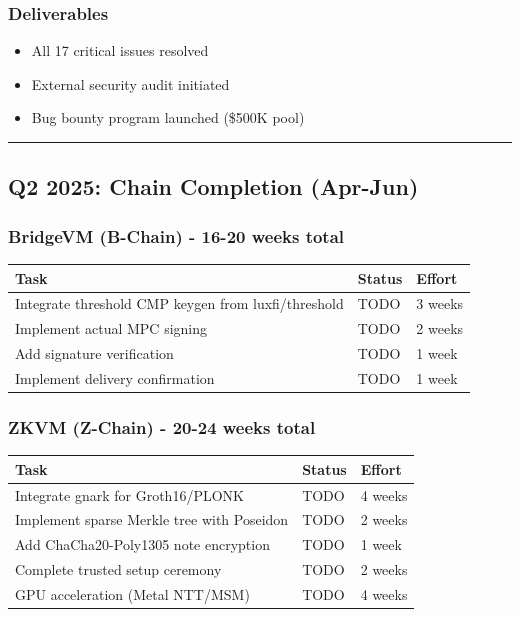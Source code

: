 \documentclass[
]{article}
\newcounter{none} %
\providecommand{\tightlist}{%
  \setlength{\itemsep}{0pt}\setlength{\parskip}{0pt}}
\begin{document}
\subsubsection{Deliverables}\label{deliverables}

\begin{itemize}
\tightlist
\item[$\square$]
  All 17 critical issues resolved
\item[$\square$]
  External security audit initiated
\item[$\square$]
  Bug bounty program launched (\$500K pool)
\end{itemize}

\begin{center}\rule{0.5\linewidth}{0.5pt}\end{center}

\subsection{Q2 2025: Chain Completion
(Apr-Jun)}\label{q2-2025-chain-completion-apr-jun}

\subsubsection{BridgeVM (B-Chain) - 16-20 weeks
total}\label{bridgevm-b-chain---16-20-weeks-total}

{\def\LTcaptype{none} %
\begin{longtable}[]{@{}lll@{}}
\toprule\noalign{}
Task & Status & Effort \\
\midrule\noalign{}
\endhead
\bottomrule\noalign{}
\endlastfoot
Integrate threshold CMP keygen from luxfi/threshold & TODO & 3 weeks \\
Implement actual MPC signing & TODO & 2 weeks \\
Add signature verification & TODO & 1 week \\
Implement delivery confirmation & TODO & 1 week \\
\end{longtable}
}

\subsubsection{ZKVM (Z-Chain) - 20-24 weeks
total}\label{zkvm-z-chain---20-24-weeks-total}

{\def\LTcaptype{none} %
\begin{longtable}[]{@{}lll@{}}
\toprule\noalign{}
Task & Status & Effort \\
\midrule\noalign{}
\endhead
\bottomrule\noalign{}
\endlastfoot
Integrate gnark for Groth16/PLONK & TODO & 4 weeks \\
Implement sparse Merkle tree with Poseidon & TODO & 2 weeks \\
Add ChaCha20-Poly1305 note encryption & TODO & 1 week \\
Complete trusted setup ceremony & TODO & 2 weeks \\
GPU acceleration (Metal NTT/MSM) & TODO & 4 weeks \\
\end{longtable}
}
\end{document}
